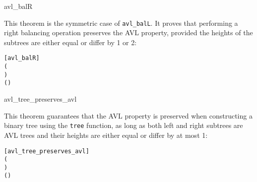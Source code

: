 \begin{thm}{avl\_balR}

This theorem is the symmetric case of \texttt{avl\_balL}. It proves that performing a right balancing operation preserves the AVL property, provided the heights of the subtrees are either equal or differ by 1 or 2:


\begin{alltt}
	[avl_balR]
	\HOLTokenTurnstile{}   \HOLSymConst{\HOLTokenConj{}}   \HOLSymConst{\HOLTokenConj{}}
   (  \HOLSymConst{=}   \HOLSymConst{\HOLTokenDisj{}}   \HOLSymConst{=}   \HOLSymConst{\ensuremath{+}}  \HOLSymConst{\HOLTokenDisj{}}
      \HOLSymConst{=}   \HOLSymConst{\ensuremath{+}}  \HOLSymConst{\HOLTokenDisj{}}   \HOLSymConst{=}   \HOLSymConst{\ensuremath{+}} ) \HOLSymConst{\HOLTokenImp{}}
    (    )
\end{alltt}

\end{thm}

\begin{thm}{avl\_tree\_preserves\_avl}

This theorem guarantees that the AVL property is preserved when constructing a binary tree using the \texttt{tree} function, as long as both left and right subtrees are AVL trees and their heights are either equal or differ by at most 1:


\begin{alltt}
	[avl_tree_preserves_avl]
	\HOLTokenTurnstile{}   \HOLSymConst{\HOLTokenConj{}}   \HOLSymConst{\HOLTokenConj{}}
   (  \HOLSymConst{=}   \HOLSymConst{\HOLTokenDisj{}}   \HOLSymConst{=}   \HOLSymConst{\ensuremath{+}}  \HOLSymConst{\HOLTokenDisj{}}
      \HOLSymConst{=}   \HOLSymConst{\ensuremath{+}} ) \HOLSymConst{\HOLTokenImp{}}
    (    )
\end{alltt}
\end{thm}

